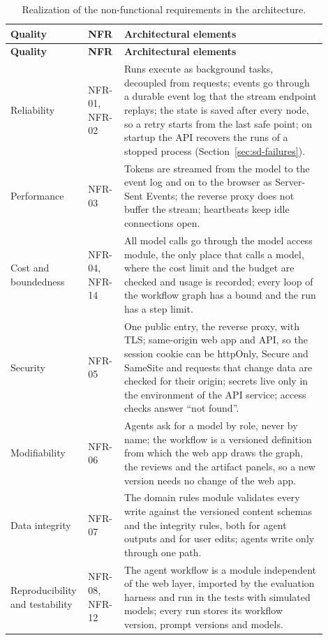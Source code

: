 \begingroup{}\small
\begin{longtable}{|p{0.17\linewidth}|p{0.11\linewidth}|p{0.62\linewidth}|}
    \caption{Realization of the non-functional requirements in the architecture.}
    \label{tab:sd-nfr-arch} \\
    \hline
    \textbf{Quality} & \textbf{NFR} & \textbf{Architectural elements} \\
    \hline
    \endfirsthead
    \hline
    \textbf{Quality} & \textbf{NFR} & \textbf{Architectural elements} \\
    \hline
    \endhead
    Reliability & NFR-01, NFR-02 & Runs execute as background tasks, decoupled from requests; events go through a durable event log that the stream endpoint replays; the state is saved after every node, so a retry starts from the last safe point; on startup the API recovers the runs of a stopped process (Section~\ref{sec:sd-failures}). \\ \hline
    Performance & NFR-03 & Tokens are streamed from the model to the event log and on to the browser as Server-Sent Events; the reverse proxy does not buffer the stream; heartbeats keep idle connections open. \\ \hline
    Cost and boundedness & NFR-04, NFR-14 & All model calls go through the model access module, the only place that calls a model, where the cost limit and the budget are checked and usage is recorded; every loop of the workflow graph has a bound and the run has a step limit. \\ \hline
    Security & NFR-05 & One public entry, the reverse proxy, with TLS; same-origin web app and API, so the session cookie can be httpOnly, Secure and SameSite and requests that change data are checked for their origin; secrets live only in the environment of the API service; access checks answer ``not found''. \\ \hline
    Modifiability & NFR-06 & Agents ask for a model by role, never by name; the workflow is a versioned definition from which the web app draws the graph, the reviews and the artifact panels, so a new version needs no change of the web app. \\ \hline
    Data integrity & NFR-07 & The domain rules module validates every write against the versioned content schemas and the integrity rules, both for agent outputs and for user edits; agents write only through one path. \\ \hline
    Reproducibility and testability & NFR-08, NFR-12 & The agent workflow is a module independent of the web layer, imported by the evaluation harness and run in the tests with simulated models; every run stores its workflow version, prompt versions and models. \\ \hline

\end{longtable}
